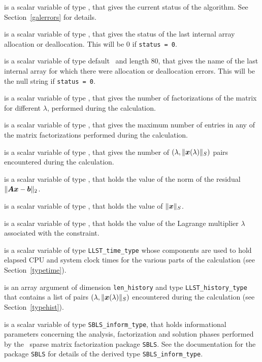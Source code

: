 \documentclass{galahad}
\newcommand{\packagename}{LLST}
\begin{document}
\begin{description}
 is a scalar variable of type \integer, that gives the
current status of the algorithm. See Section~\ref{galerrors} for details.

 is a scalar variable of type \integer,
that gives the status of the last internal array allocation
or deallocation. This will be 0 if {\tt status = 0}.

 is a scalar variable of type default \character\
and length 80, that  gives the name of the last internal array
for which there were allocation or deallocation errors.
This will be the null string if {\tt status = 0}.

 is a scalar variable of type \integer, that
gives the number of factorizations of the matrix \req{kkt}
for different $\lambda$, performed during the calculation.

 is a scalar variable of type \integer, that
gives the maximum number of entries in any of the matrix factorizations
performed during the calculation.

 is a scalar variable of type \integer, that gives
the number of $(\lambda,\|{\bm{x}}(\lambda)\|_S)$ pairs encountered during the
calculation.

 is a scalar variable of type \realdp, that holds the
value of the norm of the residual $\| {\bm{A}} {\bm{x}} - {\bm{b}}\|_2$.

 is a scalar variable of type \realdp,
that holds the value of $\|{\bm{x}}\|_S$.

 is a scalar variable of type \realdp, that holds the
value of the Lagrange multiplier $\lambda$ associated with the constraint.

 is a scalar variable of type {\tt \packagename\_time\_type}
whose components are used to hold elapsed CPU  and system clock times for the
various parts of the calculation (see Section~\ref{typetime}).

 is an array argument of dimension {\tt len\_history} and
type {\tt \packagename\_history\_type} that contains a list of pairs
$(\lambda,\|{\bm{x}}(\lambda)\|_S)$ encountered during the
calculation (see Section~\ref{typehist}).

 is a scalar variable of type {\tt SBLS\_inform\_type},
that holds informational parameters concerning the analysis, factorization
and solution phases performed by
the \galahad\ sparse matrix factorization package {\tt SBLS}.
See the documentation for the package {\tt SBLS} for details of the
derived type {\tt SBLS\_inform\_type}.


\end{description}
\end{document}

